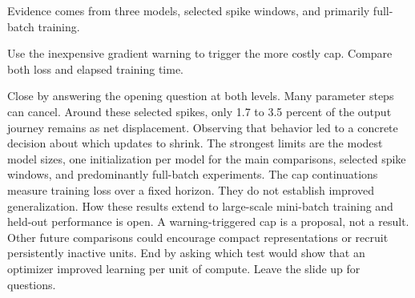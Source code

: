 {
\vspace{3mm}
\par\small Evidence comes from three models, selected spike windows, and primarily full-batch training.\par\vspace{2mm}\normalsize{}\quad Use the inexpensive gradient warning to trigger the more costly cap. Compare both loss and elapsed training time.}
{Close by answering the opening question at both levels. Many parameter steps can cancel. Around these selected spikes, only 1.7 to 3.5 percent of the output journey remains as net displacement. Observing that behavior led to a concrete decision about which updates to shrink. The strongest limits are the modest model sizes, one initialization per model for the main comparisons, selected spike windows, and predominantly full-batch experiments. The cap continuations measure training loss over a fixed horizon. They do not establish improved generalization. How these results extend to large-scale mini-batch training and held-out performance is open. A warning-triggered cap is a proposal, not a result. Other future comparisons could encourage compact representations or recruit persistently inactive units. End by asking which test would show that an optimizer improved learning per unit of compute. Leave the slide up for questions.}
